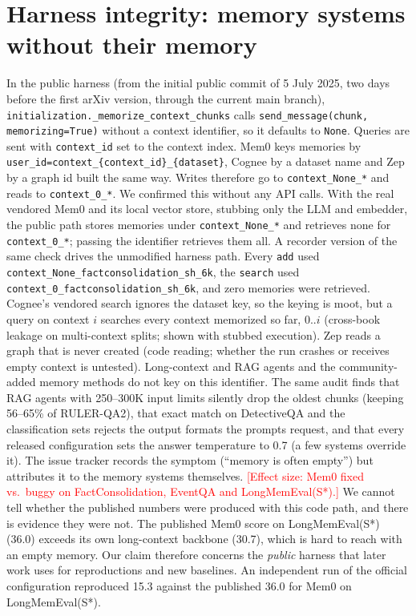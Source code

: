 \documentclass[11pt,a4paper]{article}
\newcommand{\tbd}[1]{\textcolor{red}{[#1]}}
\begin{document}
\section{Harness integrity: memory systems without their memory}
\label{sec:harness}
In the public harness (from the initial public commit of 5 July 2025, two days before the first arXiv version, through the current main branch), \texttt{initialization.\_memorize\_context\_chunks}
calls \texttt{send\_message(chunk, memorizing=True)} without a context identifier, so it defaults to
\texttt{None}. Queries are sent with \texttt{context\_id} set to the context index. Mem0 keys memories by
\texttt{user\_id=context\_\{context\_id\}\_\{dataset\}}, Cognee by a dataset name and Zep by a graph id
built the same way. Writes therefore go to \texttt{context\_None\_*} and reads to \texttt{context\_0\_*}.
We confirmed this without any API calls. With the real vendored Mem0 and its local vector store, stubbing only
the LLM and embedder, the public path stores memories under \texttt{context\_None\_*} and retrieves none for
\texttt{context\_0\_*}; passing the identifier retrieves them all. A recorder version of the same check drives
the unmodified harness path. Every \texttt{add} used \texttt{context\_None\_factconsolidation\_sh\_6k}, the \texttt{search}
used \texttt{context\_0\_factconsolidation\_sh\_6k}, and zero memories were retrieved. Cognee's vendored search ignores the dataset key, so the keying is moot, but a query on context $i$ searches every
context memorized so far, $0..i$ (cross-book leakage on multi-context splits; shown with stubbed execution). Zep reads a
graph that is never created (code reading; whether the run crashes or receives empty context is untested). Long-context and
RAG agents and the community-added memory methods do not key on this identifier. The same audit finds that RAG
agents with 250--300K input limits silently drop the oldest chunks (keeping 56--65\% of RULER-QA2), that exact
match on DetectiveQA and the classification sets rejects the output formats the prompts request, and that every
released configuration sets the answer temperature to 0.7 (a few systems override it). The
issue tracker records the symptom (``memory is often empty'') but attributes it to the memory systems themselves.
\tbd{Effect size: Mem0 fixed vs.\ buggy on FactConsolidation, EventQA and LongMemEval(S*).} We cannot tell
whether the published numbers were produced with this code path, and there is evidence they were not. The
published Mem0 score on LongMemEval(S*) (36.0) exceeds its own long-context backbone (30.7), which is hard to
reach with an empty memory. Our claim therefore concerns the \emph{public} harness that later work uses for
reproductions and new baselines. An independent run of the official
configuration reproduced 15.3 against the published 36.0 for Mem0 on LongMemEval(S*).
\end{document}
